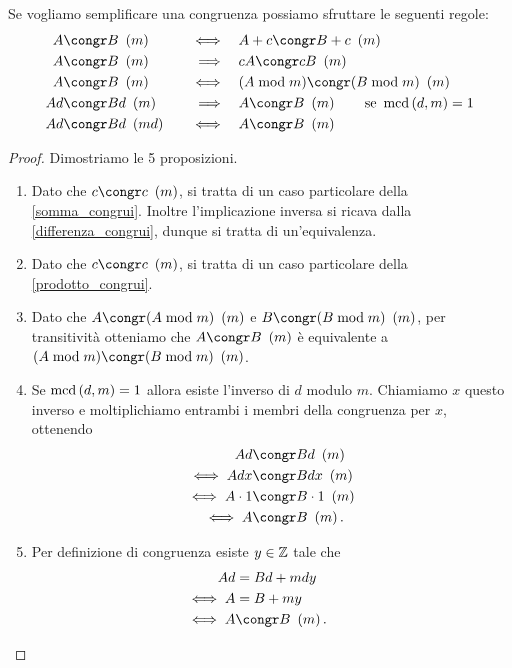 \begin{proposition}
    Se vogliamo semplificare una congruenza possiamo sfruttare le seguenti regole:
    \begin{alignat}{3}
        A &\congr B \Mod{m} \quad &\iff      \quad &A + c \congr B + c \Mod{m} \\
        A &\congr B \Mod{m} \quad &\implies  \quad &cA \congr cB \Mod{m} \\
        A &\congr B \Mod{m} \quad &\iff      \quad &(A \bmod m) \congr (B \bmod m) \Mod{m} \\
        Ad &\congr Bd \Mod{m} \quad &\implies\quad &A \congr B \Mod{m} \qquad \text{se }\mcd{d}{m} = 1\\
        Ad &\congr Bd \Mod{md} \quad &\iff   \quad &A \congr B \Mod{m}
    \end{alignat}
\end{proposition}
\begin{proof}
    Dimostriamo le 5 proposizioni.
    \begin{enumerate}
        \item Dato che $c \congr c \Mod{m}$, si tratta di un caso particolare della \ref{somma_congrui}. Inoltre l'implicazione inversa si ricava dalla \ref{differenza_congrui}, dunque si tratta di un'equivalenza.
        \item Dato che $c \congr c \Mod{m}$, si tratta di un caso particolare della \ref{prodotto_congrui}.
        \item Dato che $A \congr (A \bmod m) \Mod{m}$ e $B \congr (B \bmod m) \Mod{m}$, per transitività otteniamo che $A \congr B \Mod{m}$ è equivalente a $(A \bmod m) \congr (B \bmod m) \Mod{m}$.
        \item Se $\operatorname{mcd}\left(d, m\right) = 1$ allora esiste l'inverso di $d$ modulo $m$. Chiamiamo $x$ questo inverso e moltiplichiamo entrambi i membri della congruenza per $x$, ottenendo
        \begin{alignat*}
            {1}
            Ad &\congr Bd \Mod{m}  \\
            \iff Adx &\congr Bdx \Mod{m} \\
            \iff A \cdot 1 &\congr B \cdot 1 \Mod{m} \\
            \iff A &\congr B \Mod{m}.
        \end{alignat*}
        \item Per definizione di congruenza esiste $y \in \mathbb{Z}$ tale che
        \begin{alignat*}
            {1}
            Ad &= Bd + mdy \\
            \iff A &= B + my \\
            \iff A &\congr B \Mod{m}. \tag*{\qedhere}
        \end{alignat*}
    \end{enumerate}
\end{proof}

